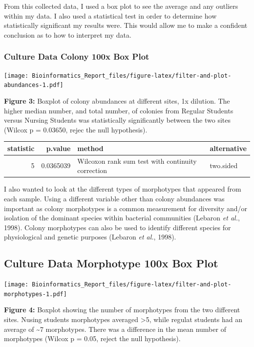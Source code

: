 \documentclass[]{article}
\begin{document}
From this collected data, I used a box plot to see the average and any
outliers within my data. I also used a statistical test in order to
determine how statistically significant my results were. This would
allow me to make a confident conclusion as to how to interpret my data.

\hypertarget{culture-data-colony-100x-box-plot}{%
\subsubsection{Culture Data Colony 100x Box
Plot}\label{culture-data-colony-100x-box-plot}}

\texttt{[image: Bioinformatics\_Report\_files/figure-latex/filter-and-plot-abundances-1.pdf]}

\textbf{Figure 3:} Boxplot of colony abundances at different sites, 1x
dilution. The higher median number, and total number, of colonies from
Regular Students versus Nursing Students was statistically significantly
between the two sites (Wilcox p = 0.03650, rejec the null hypothesis).

\begin{longtable}[]{@{}rrll@{}}
\toprule
statistic & p.value & method & alternative\tabularnewline
\midrule
\endhead
5 & 0.0365039 & Wilcoxon rank sum test with continuity correction &
two.sided\tabularnewline
\bottomrule
\end{longtable}

I also wanted to look at the different types of morphotypes that
appeared from each sample. Using a different variable other than colony
abundances was important as colony morphotypes is a common measurement
for diversity and/or isolation of the dominant species within bacterial
communities (Lebaron \emph{et al.}, 1998). Colony morphotypes can also
be used to identify different species for physiological and genetic
purposes (Lebaron \emph{et al.}, 1998).

\hypertarget{culture-data-morphotype-100x-box-plot}{%
\subsection{Culture Data Morphotype 100x Box
Plot}\label{culture-data-morphotype-100x-box-plot}}

\texttt{[image: Bioinformatics\_Report\_files/figure-latex/filter-and-plot-morphotypes-1.pdf]}

\textbf{Figure 4:} Boxplot showing the number of morphotypes from the
two different sites. Nusing students morphotypes averaged
\textgreater{}5, while regulat students had an average of
\textasciitilde{}7 morphotypes. There was a difference in the mean
number of morphotypes (Wilcox p = 0.05, reject the null hypothesis).
\end{document}

